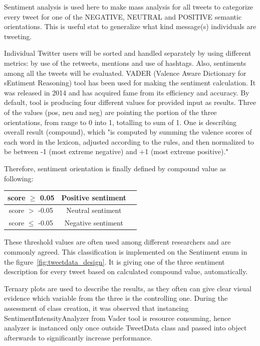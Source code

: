 Sentiment analysis is used here to make mass analysis for all tweets to categorize every tweet for one of the NEGATIVE, NEUTRAL and POSITIVE semantic orientations.
This is useful stat to generalize what kind message(s) individuals are tweeting.

Individual Twitter users will be sorted and handled separately by using different metrics: by use of the retweets, mentions and use of hashtags.
Also, sentiments among all the tweets will be evaluated.
VADER (Valence Aware Dictionary for sEntiment Reasoning) tool\cite{Hutto_Gilbert_2014} has been used for making the sentiment calculation.
It was released in 2014 and has acquired fame from its efficiency and accuracy.
By default, tool is producing four different values for provided input as results.
Three of the values (pos, neu and neg) are pointing the portion of the three orientations, from range to 0 into 1, totalling to sum of 1.
One is describing overall result (compound), which "is computed by summing the valence scores of each word in the lexicon, adjusted according to the rules, and then normalized to be between -1 (most extreme negative) and +1 (most extreme positive)."

Therefore, sentiment orientation is finally defined by compound value as following:

\begin{center}
    \begin{tabular}{ |c|c|c| }
        \hline
        score $\geq$ 0.05  & Positive sentiment \\
        \hline
        score $>$ -0.05    & Neutral sentiment  \\
        \hline
        score $\leq$ -0.05 & Negative sentiment \\
        \hline
    \end{tabular}
\end{center}

These threshold values are often used among different researchers and are commonly agreed.
This classification is implemented on the Sentiment enum in the figure~\ref{fig:tweetdata_design}.
It is giving one of the three sentiment description for every tweet based on calculated compound value, automatically.

Ternary plots are used to describe the results, as they often can give clear visual evidence which variable from the three is the controlling one.
During the assessment of class creation, it was observed that instancing SentimentIntensityAnalyzer from Vader tool is resource consuming, hence
analyzer is instanced only once outside TweetData class and passed into object afterwards to significantly increase performance.


